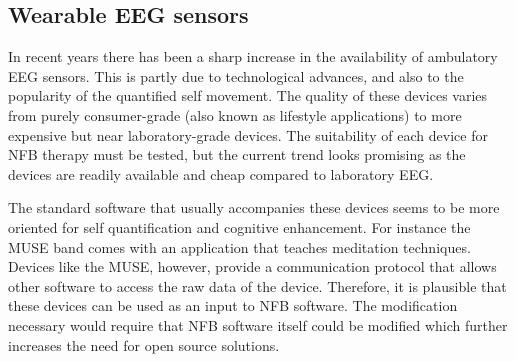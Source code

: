 \subsection{Wearable EEG sensors} %
In recent years there has been a sharp increase in the availability of ambulatory EEG sensors. This is partly due to technological advances, and also to the popularity of the quantified self movement. The quality of these devices varies from purely consumer-grade (also known as lifestyle applications) to more expensive but near laboratory-grade devices. The suitability of each device for NFB therapy must be tested, but the current trend looks promising as the devices are readily available and cheap compared to laboratory EEG. 

The standard software that usually accompanies these devices seems to be more oriented for self quantification and cognitive enhancement. For instance the MUSE band comes with an application that teaches meditation techniques. Devices like the MUSE, however, provide a communication protocol that allows other software to access the raw data of the device. Therefore, it is plausible that these devices can be used as an input to NFB software. The modification necessary would require that NFB software itself could be modified which further increases the need for open source solutions.
